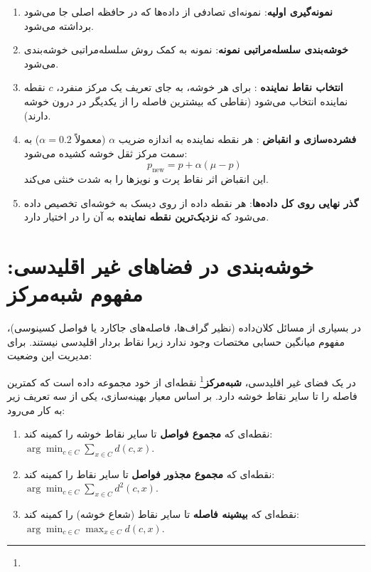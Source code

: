 \begin{algorithmbox}
\begin{enumerate}
    \item \textbf{نمونه‌گیری اولیه}: نمونه‌ای تصادفی از داده‌ها که در حافظه اصلی جا می‌شود برداشته می‌شود.
    \item \textbf{خوشه‌بندی سلسله‌مراتبی نمونه}: نمونه به کمک روش سلسله‌مراتبی خوشه‌بندی می‌شود.
    \item \textbf{انتخاب نقاط نماینده }: برای هر خوشه، به جای تعریف یک مرکز منفرد، $c$ نقطه نماینده انتخاب می‌شود (نقاطی که بیشترین فاصله را از یکدیگر در درون خوشه دارند).
    \item \textbf{فشرده‌سازی و انقباض }: هر نقطه نماینده به اندازه ضریب $\alpha$ (معمولاً $\alpha = 0.2$) به سمت مرکز ثقل خوشه کشیده می‌شود:
    \begin{equation}
    p_{\text{new}} = p + \alpha (\mu - p)
    \end{equation}
    این انقباض اثر نقاط پرت و نویزها را به شدت خنثی می‌کند.
    \item \textbf{گذر نهایی روی کل داده‌ها}: هر نقطه داده از روی دیسک به خوشه‌ای تخصیص داده می‌شود که \textbf{نزدیک‌ترین نقطه نماینده} به آن را در اختیار دارد.
\end{enumerate}
\end{algorithmbox}

\section{خوشه‌بندی در فضاهای غیر اقلیدسی: مفهوم شبه‌مرکز \texorpdfstring{}{(Clustroid)}}
در بسیاری از مسائل کلان‌داده (نظیر گراف‌ها، فاصله‌های جاکارد یا فواصل کسینوسی)، مفهوم میانگین حسابی مختصات وجود ندارد زیرا نقاط بردار اقلیدسی نیستند. برای مدیریت این وضعیت:
\begin{definition}
در یک فضای غیر اقلیدسی، \textbf{شبه‌مرکز}\footnote{} نقطه‌ای از خود مجموعه داده است که کمترین فاصله را تا سایر نقاط خوشه دارد. بر اساس معیار بهینه‌سازی، یکی از سه تعریف زیر به کار می‌رود:
\begin{enumerate}
    \item نقطه‌ای که \textbf{مجموع فواصل} تا سایر نقاط خوشه را کمینه کند: $\arg\min_{c \in C} \sum_{x \in C} d(c, x)$.
    \item نقطه‌ای که \textbf{مجموع مجذور فواصل} تا سایر نقاط را کمینه کند: $\arg\min_{c \in C} \sum_{x \in C} d^2(c, x)$.
    \item نقطه‌ای که \textbf{بیشینه فاصله} تا سایر نقاط (شعاع خوشه) را کمینه کند: $\arg\min_{c \in C} \max_{x \in C} d(c, x)$.
\end{enumerate}
\end{definition}


